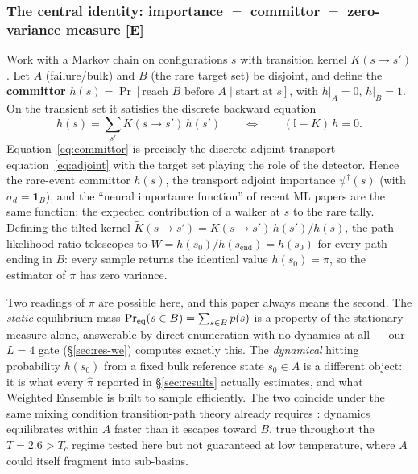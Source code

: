 \documentclass[a4paper,fleqn]{cas-sc}
\newcommand{\dg}{^{\dagger}}
\begin{document}
\subsubsection{The central identity: importance $=$ committor $=$ zero-variance measure \textbf{[E]}}\label{sec:identity}
Work with a Markov chain on configurations $s$ with transition kernel $K(s\to s')$. Let $A$
(failure/bulk) and $B$ (the rare target set) be disjoint, and define the \textbf{committor}
$h(s)=\Pr[\text{reach }B\text{ before }A\mid\text{start at }s]$, with $h|_A=0$, $h|_B=1$.
On the transient set it satisfies the discrete backward equation
\begin{equation}
	h(s)=\sum_{s'}K(s\to s')\,h(s')\qquad\Longleftrightarrow\qquad (\mathbb I-K)\,h=0 .
	\label{eq:committor}
\end{equation}
Equation~\eqref{eq:committor} is precisely the discrete adjoint transport
equation~\eqref{eq:adjoint} with the target set playing the role of the detector. Hence the
rare-event committor $h(s)$, the transport adjoint importance $\psi\dg(s)$ (with
$\sigma_d=\mathbf 1_B$), and the ``neural importance function'' of recent ML papers are the
same function: the expected contribution of a walker at $s$ to the rare tally. Defining the
tilted kernel $\widetilde K(s\to s')=K(s\to s')\,h(s')/h(s)$, the path likelihood ratio
telescopes to $W=h(s_0)/h(s_{\text{end}})=h(s_0)$ for every path ending in $B$: every sample
returns the identical value $h(s_0)=\pi$, so the estimator of $\pi$ has zero variance.

Two readings of $\pi$ are possible here, and this paper always means the second. The
\emph{static} equilibrium mass $\Pr_{\rm eq}(s\in B)=\sum_{s\in B}p(s)$ is a property of the
stationary measure alone, answerable by direct enumeration with no dynamics at all --- our
$L=4$ gate (\S\ref{sec:res-we}) computes exactly this. The \emph{dynamical} hitting
probability $h(s_0)$ from a fixed bulk reference state $s_0\in A$ is a different object: it
is what every $\hat\pi$ reported in \S\ref{sec:results} actually estimates, and what
Weighted Ensemble is built to sample efficiently. The two coincide under the same mixing
condition transition-path theory already requires \cite{e2006}: dynamics equilibrates
within $A$ faster than it escapes toward $B$, true throughout the $T=2.6>T_c$ regime tested
here but not guaranteed at low temperature, where $A$ could itself fragment into
sub-basins.
\end{document}
